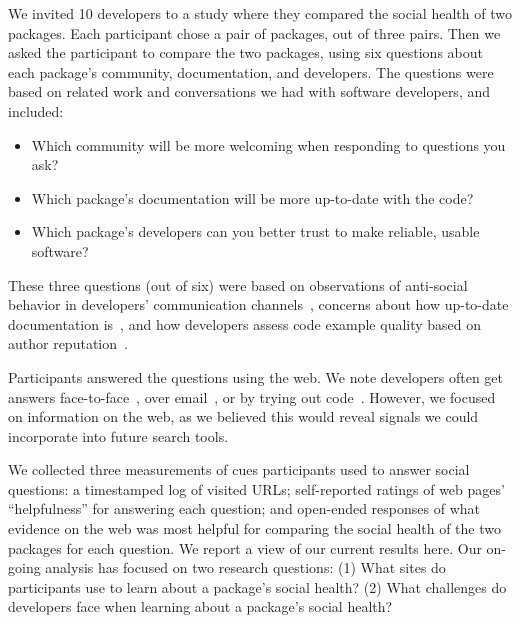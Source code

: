 We invited 10 developers to a study where they compared the social health of two packages.
Each participant chose a pair of packages, out of three pairs.
Then we asked the participant to compare the two packages, using six questions about each package's community, documentation, and developers.
The questions were based on related work and conversations we had with software developers, and included:
\begin{itemize}
\setlength{\itemsep}{0pt}
\setlength{\parskip}{0pt}
\setlength{\parsep}{0pt}  
\item Which community will be more welcoming when responding to questions you ask?
\item Which package's documentation will be more up-to-date with the code?
\item Which package's developers can you better trust to make reliable, usable software?
\end{itemize}
These three questions (out of six) were based on observations of anti-social behavior in developers' communication channels~\cite{storey_revolution_2014}, concerns about how up-to-date documentation is~\cite{storey_revolution_2014,nykaza_what_2002,lethbridge_how_2003,robillard_field_2011}, and how developers assess code example quality based on author reputation~\cite{robillard_field_2011}.

Participants answered the questions using the web.
We note developers often get answers face-to-face~\cite{latoza_maintaining_2006,storey_revolution_2014}, over email~\cite{latoza_maintaining_2006,ko_information_2007}, or by trying out code~\cite{brandt_two_2009}.
However, we focused on information on the web, as we believed this would reveal signals we could incorporate into future search tools.

We collected three measurements of cues participants used to answer social questions:
a timestamped log of visited URLs;
self-reported ratings of web pages' ``helpfulness'' for answering each question;
and open-ended responses of what evidence on the web was most helpful for comparing the social health of the two packages for each question.
We report a view of our current results here.
Our on-going analysis has focused on two research questions:
(1) What sites do participants use to learn about a package's social health?
(2) What challenges do developers face when learning about a package's social health?

